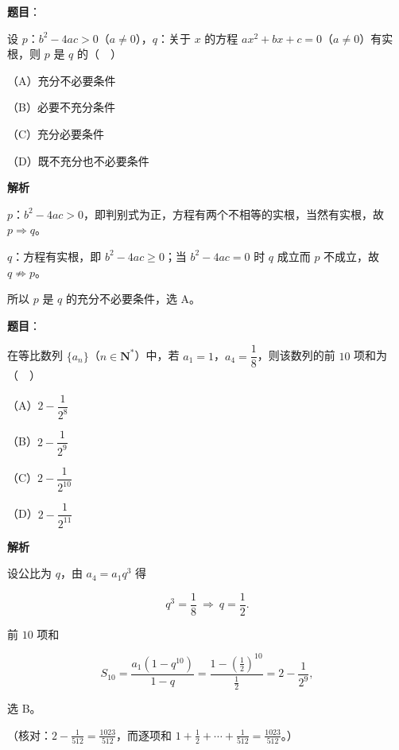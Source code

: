 \begin{answer}

\textbf{题目}：

设 $p$：$b^2-4ac>0$（$a\neq0$），$q$：关于 $x$ 的方程 $ax^2+bx+c=0$（$a\neq0$）有实根，则 $p$ 是 $q$ 的（　）

（A）充分不必要条件

（B）必要不充分条件

（C）充分必要条件

（D）既不充分也不必要条件

\textbf{解析}

$p$：$b^2-4ac>0$，即判别式为正，方程有两个不相等的实根，当然有实根，故 $p\Rightarrow q$。

$q$：方程有实根，即 $b^2-4ac\geqslant0$；当 $b^2-4ac=0$ 时 $q$ 成立而 $p$ 不成立，故 $q\not\Rightarrow p$。

所以 $p$ 是 $q$ 的充分不必要条件，选 A。


\end{answer}
\begin{answer}

\textbf{题目}：

在等比数列 $\{a_n\}$（$n\in\mathbf N^*$）中，若 $a_1=1$，$a_4=\dfrac18$，则该数列的前 $10$ 项和为（　）

（A）$2-\dfrac1{2^8}$

（B）$2-\dfrac1{2^9}$

（C）$2-\dfrac1{2^{10}}$

（D）$2-\dfrac1{2^{11}}$

\textbf{解析}

设公比为 $q$，由 $a_4=a_1q^3$ 得

\nopagebreak[4]
\[q^3=\frac18\ \Longrightarrow\ q=\frac12 .\]

前 $10$ 项和

\nopagebreak[4]
\[S_{10}=\frac{a_1(1-q^{10})}{1-q}=\frac{1-\left(\frac12\right)^{10}}{\frac12}=2-\frac{1}{2^9},\]

选 B。

（核对：$2-\frac1{512}=\frac{1023}{512}$，而逐项和 $1+\frac12+\cdots+\frac1{512}=\frac{1023}{512}$。）


\end{answer}

